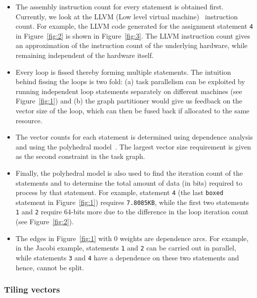 \begin{itemize}

\item The assembly instruction count for every statement is obtained
  first. Currently, we look at the LLVM (Low level virtual
  machine)~\cite{clat04} instruction count. For example, the LLVM code
  generated for the assignment statement \texttt{4} in
  Figure~\ref{fig:2} is shown in Figure~\ref{fig:3}. The LLVM
  instruction count gives an approximation of the instruction count of
  the underlying hardware, while remaining independent of the hardware
  itself.

\item Every loop is fissed thereby forming multiple statements. The
  intuition behind fissing the loops is two fold: (a) task parallelism
  can be exploited by running independent loop statements separately on
  different machines (see Figure~\ref{fig:1}) and (b) the graph
  partitioner would give us feedback on the vector size of the loop,
  which can then be fused back if allocated to the same resource.

\item The vector counts for each statement is determined using
  dependence analysis and using the polyhedral model~\cite{mgri98}. The
  largest vector size requirement is given as the second constraint in
  the task graph.

\item Finally, the polyhedral model is also used to find the iteration
  count of the statements and to determine the total amount of data (in
  bits) required to process by that statement. For example, statement
  \texttt{4} (the last \texttt{boxed} statement in Figure~\ref{fig:1})
  requires \texttt{7.8085KB}, while the first two statements \texttt{1}
  and \texttt{2} require 64-bits more due to the difference in the loop
  iteration count (see Figure~\ref{fig:2}).

\item The edges in Figure~\ref{fig:1} with 0 weights are dependence
  arcs. For example, in the Jacobi example, statements \texttt{1} and
  \texttt{2} can be carried out in parallel, while statements
  \texttt{3} and \texttt{4} have a dependence on these two statements
  and hence, cannot be split.

\end{itemize}

\subsubsection{Tiling vectors}
\label{sec:tiling-vector-counts}

